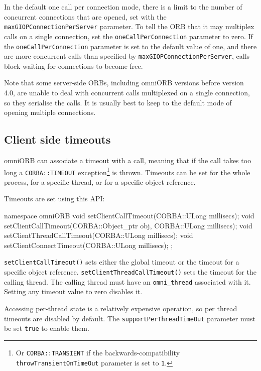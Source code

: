 \documentclass[11pt,oneside,a4paper]{book}
\newcommand{\code}[1]{\texttt{#1}}
\newcommand{\op}[1]{\texttt{#1()}}
\newcommand{\dsc}{\discretionary{}{}{}}
\begin{document}
In the default one call per connection mode, there is a limit to the
number of concurrent connections that are opened, set with the
\code{maxGIOPConnection\dsc{}PerServer} parameter. To tell the ORB
that it may multiplex calls on a single connection, set the
\code{oneCallPerConnection} parameter to zero. If the
\code{oneCallPer\dsc{}Connection} parameter is set to the default
value of one, and there are more concurrent calls than specified by
\code{maxGIOPConnectionPerServer}, calls block waiting for connections
to become free.

Note that some server-side ORBs, including omniORB versions before
version 4.0, are unable to deal with concurrent calls multiplexed on a
single connection, so they serialise the calls. It is usually best to
keep to the default mode of opening multiple connections.


\subsection{Client side timeouts}
\label{sec:timeoutAPI}

omniORB can associate a timeout with a call, meaning that if the call
takes too long a \code{CORBA::TIMEOUT} exception\footnote{Or
  \code{CORBA::TRANSIENT} if the backwards-compatibility
  \code{throwTransientOnTimeOut} parameter is set to \code{1}.} is
thrown. Timeouts can be set for the whole process, for a specific
thread, or for a specific object reference.

Timeouts are set using this API:

\begin{cxxlisting}
namespace omniORB {
  void setClientCallTimeout(CORBA::ULong millisecs);
  void setClientCallTimeout(CORBA::Object_ptr obj, CORBA::ULong millisecs);
  void setClientThreadCallTimeout(CORBA::ULong millisecs);
  void setClientConnectTimeout(CORBA::ULong millisecs);
};
\end{cxxlisting}

\op{setClientCallTimeout} sets either the global timeout or the
timeout for a specific object reference.
\op{setClientThreadCallTimeout} sets the timeout for the calling
thread. The calling thread must have an \code{omni\_thread} associated
with it. Setting any timeout value to zero disables it.

Accessing per-thread state is a relatively expensive operation, so per
thread timeouts are disabled by default. The
\code{supportPerThreadTimeOut} parameter must be set \code{true} to
enable them.
\end{document}
